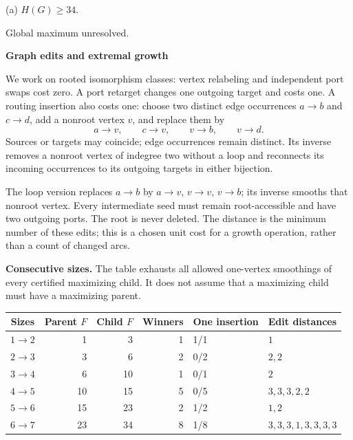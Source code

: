 \documentclass[10pt,a4paper]{article}
\begin{document}
\noindent\hfill
\begin{minipage}[t]{.96\textwidth}\centering
\resizebox{14cm}{!}{}\par
{\footnotesize (a) $H(G)\ge 34$.\par Global maximum unresolved.}\par
\end{minipage}\hfill
\par\vspace{2.5mm}
\clearpage
{\Large\bfseries Graph edits and extremal growth}\par\vspace{4mm}
We work on rooted isomorphism classes: vertex relabeling and independent port swaps cost zero. A port retarget changes one outgoing target and costs one. A routing insertion also costs one: choose two distinct edge occurrences $a\to b$ and $c\to d$, add a nonroot vertex $v$, and replace them by\[a\to v,\qquad c\to v,\qquad v\to b,\qquad v\to d.\]Sources or targets may coincide; edge occurrences remain distinct. Its inverse removes a nonroot vertex of indegree two without a loop and reconnects its incoming occurrences to its outgoing targets in either bijection.\par\vspace{2mm}
The loop version replaces $a\to b$ by $a\to v$, $v\to v$, $v\to b$; its inverse smooths that nonroot vertex. Every intermediate seed must remain root-accessible and have two outgoing ports. The root is never deleted. The distance is the minimum number of these edits; this is a chosen unit cost for a growth operation, rather than a count of changed arcs.\par\vspace{3mm}
\textbf{Consecutive sizes.} The table exhausts all allowed one-vertex smoothings of every certified maximizing child. It does not assume that a maximizing child must have a maximizing parent.\par\vspace{3mm}
\begin{center}\small\begin{tabular}{crrrll}
\toprule Sizes & Parent $F$ & Child $F$ & Winners & One insertion & Edit distances \\ \midrule
$1\to2$ & 1 & 3 & 1 & 1/1 & $1$ \\
$2\to3$ & 3 & 6 & 2 & 0/2 & $2,2$ \\
$3\to4$ & 6 & 10 & 1 & 0/1 & $2$ \\
$4\to5$ & 10 & 15 & 5 & 0/5 & $3,3,3,2,2$ \\
$5\to6$ & 15 & 23 & 2 & 1/2 & $1,2$ \\
$6\to7$ & 23 & 34 & 8 & 1/8 & $3,3,3,1,3,3,3,3$ \\
\bottomrule\end{tabular}\end{center}\vspace{3mm}
\end{document}
